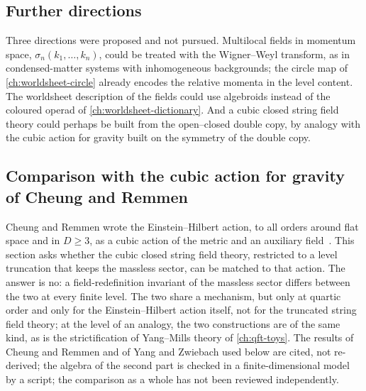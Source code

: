 \subsection{Further directions}
\label{sec:open:directions}

Three directions were proposed and not pursued.
Multilocal fields in momentum space, $\sigma_n(k_1, \dots, k_n)$, could be treated with the Wigner--Weyl transform, as in condensed-matter systems with inhomogeneous backgrounds; the circle map of \cref{ch:worldsheet-circle} already encodes the relative momenta in the level content.
The worldsheet description of the fields could use \Loo{} algebroids instead of the coloured operad of \cref{ch:worldsheet-dictionary}.
And a cubic closed string field theory could perhaps be built from the open--closed double copy, by analogy with the cubic action for gravity built on the symmetry of the double copy.

\subsection{Comparison with the cubic action for gravity of Cheung and Remmen}
\label{sec:open:cheung-remmen}

Cheung and Remmen wrote the Einstein--Hilbert action, to all orders around flat space and in $D \ge 3$, as a cubic action of the metric and an auxiliary field~\cite{Cheung:2017:HiddenSimplicityGravity}.
This section asks whether the cubic closed string field theory, restricted to a level truncation that keeps the massless sector, can be matched to that action.
The answer is no: a field-redefinition invariant of the massless sector differs between the two at every finite level.
The two share a mechanism, but only at quartic order and only for the Einstein--Hilbert action itself, not for the truncated string field theory; at the level of an analogy, the two constructions are of the same kind, as is the strictification of Yang--Mills theory of \cref{ch:qft-toys}.
The results of Cheung and Remmen and of Yang and Zwiebach used below are cited, not re-derived; the algebra of the second part is checked in a finite-dimensional model by a script; the comparison as a whole has not been reviewed independently.

